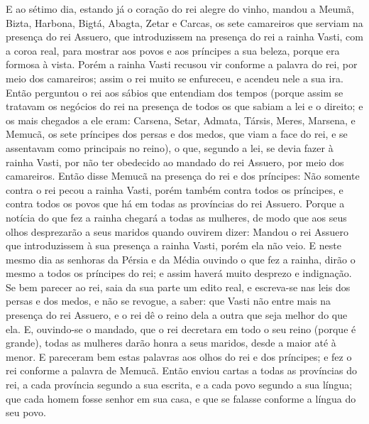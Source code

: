 E ao sétimo dia, estando já o coração do rei alegre do vinho,
mandou a Meumã, Bizta, Harbona, Bigtá, Abagta, Zetar e Carcas, os
sete camareiros que serviam na presença do rei Assuero, que
introduzissem na presença do rei a rainha Vasti, com a coroa real,
para mostrar aos povos e aos príncipes a sua beleza, porque era
formosa à vista. Porém a rainha Vasti recusou vir conforme a
palavra do rei, por meio dos camareiros; assim o rei muito se
enfureceu, e acendeu nele a sua ira. Então perguntou o rei
aos sábios que entendiam dos tempos (porque assim se tratavam os
negócios do rei na presença de todos os que sabiam a lei e o
direito; e os mais chegados a ele eram: Carsena, Setar,
Admata, Társis, Meres, Marsena, e Memucã, os sete príncipes dos
persas e dos medos, que viam a face do rei, e se assentavam como
principais no reino), o que, segundo a lei, se devia fazer à
rainha Vasti, por não ter obedecido ao mandado do rei Assuero, por
meio dos camareiros. Então disse Memucã na presença do rei e
dos príncipes: Não somente contra o rei pecou a rainha Vasti, porém
também contra todos os príncipes, e contra todos os povos que há em
todas as províncias do rei Assuero. Porque a notícia do que
fez a rainha chegará a todas as mulheres, de modo que aos seus olhos
desprezarão a seus maridos quando ouvirem dizer: Mandou o rei
Assuero que introduzissem à sua presença a rainha Vasti, porém ela
não veio. E neste mesmo dia as senhoras da Pérsia e da Média
ouvindo o que fez a rainha, dirão o mesmo a todos os príncipes do
rei; e assim haverá muito desprezo e indignação. Se bem
parecer ao rei, saia da sua parte um edito real, e escreva-se nas
leis dos persas e dos medos, e não se revogue, a saber: que Vasti
não entre mais na presença do rei Assuero, e o rei dê o reino dela a
outra que seja melhor do que ela. E, ouvindo-se o mandado,
que o rei decretara em todo o seu reino (porque é grande), todas as
mulheres darão honra a seus maridos, desde a maior até à menor.
E pareceram bem estas palavras aos olhos do rei e dos
príncipes; e fez o rei conforme a palavra de Memucã. Então
enviou cartas a todas as províncias do rei, a cada província segundo
a sua escrita, e a cada povo segundo a sua língua; que cada homem
fosse senhor em sua casa, e que se falasse conforme a língua do seu
povo.

\medskip

